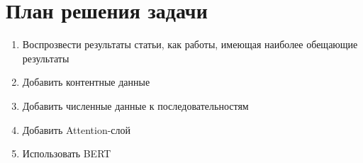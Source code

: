 \chapter{План решения задачи}

\begin{enumerate}
    \item Воспрозвести результаты статьи, как работы, имеющая наиболее обещающие результаты
    \item Добавить контентные данные
    \item Добавить численные данные к последовательностям
    \item Добавить Attention-слой
    \item Использовать BERT
\end{enumerate}